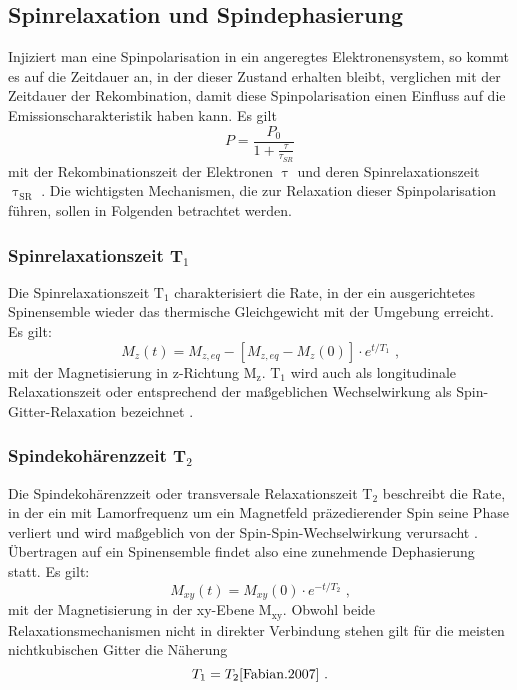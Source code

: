\subsection{Spinrelaxation und Spindephasierung}
Injiziert man eine Spinpolarisation in ein angeregtes Elektronensystem, so kommt es auf die Zeitdauer an, in der dieser Zustand erhalten bleibt, verglichen mit der Zeitdauer der Rekombination, damit diese Spinpolarisation einen Einfluss auf die Emissionscharakteristik haben kann. Es gilt
\begin{equation}
P=\frac{P_0}{1+ \frac{\tau}{\tau_{SR}}}
\end{equation}
mit der Rekombinationszeit der Elektronen $\uptau$ und deren Spinrelaxationszeit $\uptau_\text{SR}$ \cite{Dyakonov.2008}. Die wichtigsten Mechanismen, die zur Relaxation dieser Spinpolarisation führen, sollen in Folgenden betrachtet werden.
\subsubsection{Spinrelaxationszeit T$_\text{1}$}
Die Spinrelaxationszeit $\text{T}_\text{1}$ charakterisiert die Rate, in der ein ausgerichtetes Spinensemble wieder das thermische Gleichgewicht mit der Umgebung erreicht. Es gilt:
\begin{equation}
M_z(t)=M_{z,eq} -\left[ M_{z,eq}-M_z(0)\right]\cdot e^{t/T_1} \text{ ,}
\end{equation}
mit der Magnetisierung in z-Richtung $\text{M}_\text{z}$. T$_\text{1}$ wird auch als longitudinale Relaxationszeit oder entsprechend der maßgeblichen Wechselwirkung als Spin-Gitter-Relaxation bezeichnet \cite{Zutic.2004}.
\subsubsection{Spindekohärenzzeit T$_\text{2}$}
Die Spindekohärenzzeit oder transversale Relaxationszeit T$_\text{2}$ beschreibt die Rate, in der ein mit Lamorfrequenz um ein Magnetfeld präzedierender Spin seine Phase verliert und wird maßgeblich von der Spin-Spin-Wechselwirkung verursacht \cite{Fabian.2007}. Übertragen auf ein Spinensemble findet also eine zunehmende Dephasierung statt. Es gilt:
\begin{equation}
M_{xy}(t)=M_{xy}(0)\cdot e^{-t/T_2} \text{ ,}
\end{equation}
mit der Magnetisierung in der xy-Ebene $\text{M}_\text{xy}$. Obwohl beide Relaxationsmechanismen nicht in direkter Verbindung stehen gilt für die meisten nichtkubischen Gitter die Näherung
\begin{equation}
T_1 = T_2 \text{\cite{Fabian.2007} .}
\end{equation}
